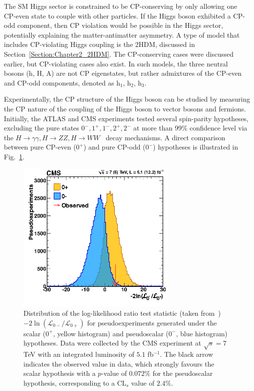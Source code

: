 The SM Higgs sector is constrained to be CP-conserving by only allowing one CP-even state to couple with other particles. If the Higgs boson exhibited a CP-odd component, then CP violation would be possible in the Higgs sector, potentially explaining the matter-antimatter asymmetry. A type of model that includes CP-violating Higgs coupling is the 2HDM, discussed in Section~\ref{Section:Chapter2_2HDM}. The CP-conserving cases were discussed earlier, but CP-violating cases also exist. In such models, the three neutral bosons (h, H, A) are not CP eigenstates, but rather admixtures of the CP-even and CP-odd components, denoted as h$_1$, h$_2$, h$_3$.

Experimentally, the CP structure of the Higgs boson can be studied by measuring the CP nature of the coupling of the Higgs boson to vector bosons and fermions. Initially, the ATLAS and CMS experiments tested several spin-parity hypotheses, excluding the pure states $0^-,1^+,1^-,2^+,2^-$ at more than 99\% confidence level via the $H\to \gamma\gamma, H\to ZZ, H\to WW$~\cite{CP_constraints_1,CP_constraints_2,CP_constraints_3} decay mechanisms. A direct comparison between pure CP-even ($0^+$) and pure CP-odd ($0^-$) hypotheses is illustrated in Fig.~\ref{Figure:Chapter2_CPevenVsCPodd}. 

\begin{figure}[h]
\centering
\includegraphics[width= 0.7\textwidth]{Figures/Chapter2/SpinParity.png}
\caption{Distribution of the log-likelihood ratio test statistic (taken from~\cite{CP_constraints_2}) $-2\ln(\mathcal{L}_{0-}/\mathcal{L}_{0+})$ for pseudoexperiments generated under the scalar ($0^+$, yellow histogram) and pseudoscalar ($0^-$, blue histogram) hypotheses. Data were collected by the CMS experiment at $\sqrt{s} = 7$ TeV with an integrated luminosity of $5.1$ fb$^{-1}$. The black arrow indicates the observed value in data, which strongly favours the scalar hypothesis with a $p$-value of $0.072\%$ for the pseudoscalar hypothesis, corresponding to a $\text{CL}_s$ value of $2.4\%$.}\label{Figure:Chapter2_CPevenVsCPodd}
\end{figure}

